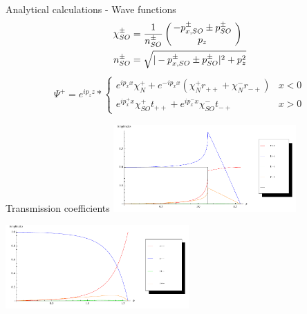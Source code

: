 \documentclass{beamer}
\newcommand{\vect}[2]{\ensuremath{\inp{\hspace{-.8ex}\begin{array}{c}#1\\#2\end{array}\hspace{-.4ex}}}}
\newcommand{\inp}[1]{\ensuremath{\left(#1\right)}}
\begin{document}
\begin{frame}{Analytical calculations - Wave functions}
    \begin{align*}
    \chi_{SO}^{\pm} &= \frac{1}{n_{SO}^{\pm}} 
                        \vect{-p_{x,SO}^{\pm} \pm p_{SO}^\pm}{p_z} \\
        n_{SO}^{\pm}   &= \sqrt{|-p_{x,SO}^{\pm} \pm p_{SO}^\pm|^2 +
            p_z^2}
    \end{align*}
    \pause
    \begin{align*}
        \Psi^+ = e^{i p_z z} * \left\{
            \begin{array}{ll}
                e^{i p_x x} \chi_N^+ + e^{- i p_x x} (\chi_N^+ r_{++} +
                        \chi_N^- r_{-+})    & x < 0\\
                e^{i p_x^+ x} \chi_{SO}^+ t_{++} + e^{i p_x^- x}
                \chi_{SO}^- t_{-+}          & x > 0
            \end{array} \right.
    \end{align*}

\end{frame}

\begin{frame}{Transmission coefficients}
    \includegraphics[width=7.0cm]{zero-plus.pdf}

    \includegraphics[width=7.0cm]{zero-minus.pdf}
\end{frame}
\end{document}
